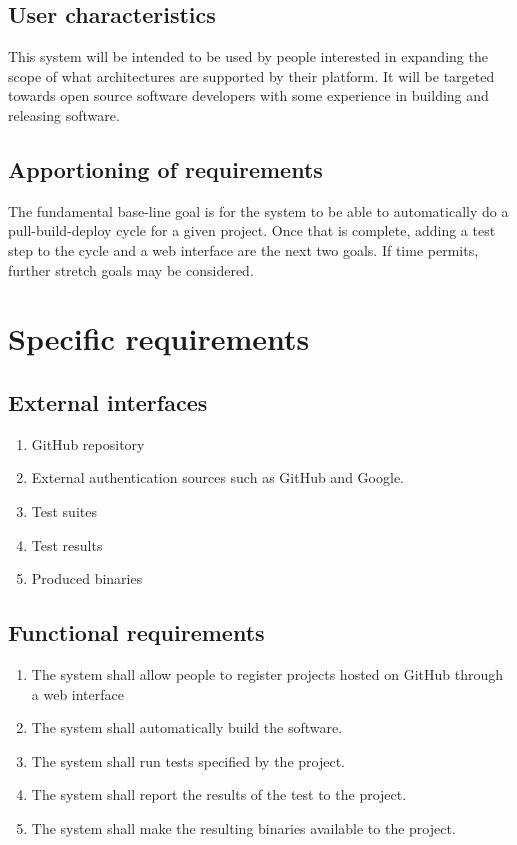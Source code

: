 \documentclass[10pt,letterpaper,onecolumn,draftclsnofoot]{IEEEtran}
\begin{document}
\subsection{User characteristics}
This system will be intended to be used by people interested in expanding the scope of what architectures are supported by their platform. It will be targeted towards open source software developers with some experience in building and releasing software.
\subsection{Apportioning of requirements}
The fundamental base-line goal is for the system to be able to automatically do a pull-build-deploy cycle for a given project. Once that is complete, adding a test step to the cycle and a web interface are the next two goals. If time permits, further stretch goals may be considered.

\section{Specific requirements}
\subsection{External interfaces}
\begin{enumerate}
\item GitHub repository
\item External authentication sources such as GitHub and Google.
\item Test suites
\item Test results
\item Produced binaries
\end{enumerate}
\subsection{Functional requirements}
\begin{enumerate}
\item The system shall allow people to register projects hosted on GitHub through a web interface
\item The system shall automatically build the software.
\item The system shall run tests specified by the project.
\item The system shall report the results of the test to the project.
\item The system shall make the resulting binaries available to the project.
\end{enumerate}
\end{document}
